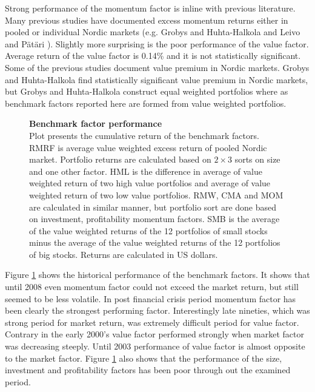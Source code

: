 \documentclass{article}
\begin{document}
Strong performance of the momentum factor is inline with previous literature. Many previous studies have documented excess momentum returns either in pooled or individual Nordic markets (e.g. Grobys and Huhta-Halkola \citeyear{grobys} and Leivo and Pätäri \citeyear{leivo2011}). Slightly more surprising is the poor performance of the value factor. Average return of the value factor is 0.14\% and it is not statistically significant. Some of the previous studies document value premium in Nordic markets. Grobys and Huhta-Halkola \citeyear{grobys} find statistically significant value premium in Nordic markets, but Grobys and Huhta-Halkola construct equal weighted portfolios where as benchmark factors reported here are formed from value weighted portfolios. \par

\begin{figure}[h]
\centering
\caption[Benchmark factor performance]{\textbf{Benchmark factor performance}\\ Plot presents the cumulative return of the benchmark factors. RMRF is average value weighted excess return of pooled Nordic market. Portfolio returns are calculated based on $2 \times 3$ sorts on size and one other factor. HML is the difference in average of value weighted return of two high value portfolios and average of value weighted return of two low value portfolios. RMW, CMA and MOM are calculated in similar manner, but portfolio sort are done based on investment, profitability momentum factors. SMB is the average of the value weighted returns of the 12 portfolios of small stocks minus the average of the value weighted returns of the 12 portfolios of big stocks. Returns are calculated in US dollars.}

\label{plot:factor_performance}
\end{figure}

Figure \ref{plot:factor_performance} shows the historical performance of the benchmark factors. It shows that until 2008 even momentum factor could not exceed the market return, but still seemed to be less volatile. In post financial crisis period momentum factor has been clearly the strongest performing factor. Interestingly late nineties, which was strong period for market return, was extremely difficult period for value factor. Contrary in the early 2000's value factor performed strongly when market factor was decreasing steeply. Until 2003 performance of value factor is almost opposite to the market factor. Figure \ref{plot:factor_performance} also shows that the performance of the size, investment and profitability factors has been poor through out the examined period. \par
\end{document}
